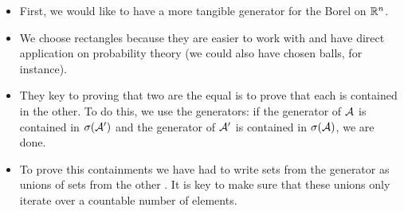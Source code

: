 \begin{itemize}
	\item First, we would like to have a more tangible generator for the Borel \siga on $\mathbb{R}^n$.
	\item We choose rectangles because they are easier to work with and have direct application on probability theory (we could also have chosen balls, for instance).
	\item They key to proving that two \sigas are the equal is to prove that each is contained in the other. To do this, we use the generators: if the generator of $\mathcal{A}$ is contained in $\sigma(\mathcal{A}')$ and the generator of $\mathcal{A}'$ is contained in $\sigma(\mathcal{A})$, we are done.
	\item To prove this containments we have had to write sets from the generator as unions of sets from the other \siga. It is key to make sure that these unions only iterate over a countable number of elements.
\end{itemize}

